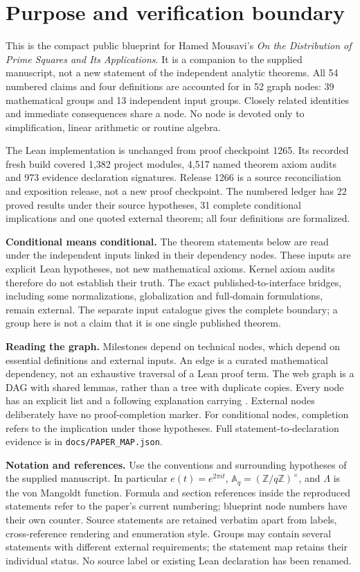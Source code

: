\section*{Purpose and verification boundary}
This is the compact public blueprint for Hamed Mousavi's
\emph{On the Distribution of Prime Squares and Its Applications}.
It is a companion to the supplied manuscript, not a new statement of the
independent analytic theorems. All 54 numbered claims and four definitions
are accounted for in 52 graph nodes: 39 mathematical groups and 13 independent
input groups. Closely related identities and immediate consequences share a
node. No node is devoted only to simplification, linear arithmetic or routine
algebra.

The Lean implementation is unchanged from proof checkpoint 1265.
Its recorded fresh build covered 1,382 project modules, 4,517 named theorem
axiom audits and 973 evidence declaration signatures. Release 1266 is a
source reconciliation and exposition release, not a new proof checkpoint.
The numbered ledger has 22 proved results under their source hypotheses,
31 complete conditional implications and one quoted external theorem;
all four definitions are formalized.

\textbf{Conditional means conditional.}
The theorem statements below are read under the independent inputs linked
in their dependency nodes. These inputs are explicit Lean hypotheses, not
new mathematical axioms. Kernel axiom audits therefore do not establish
their truth. The exact published-to-interface bridges, including some
normalizations, globalization and full-domain formulations, remain external.
The separate input catalogue gives the complete boundary; a group here is
not a claim that it is one single published theorem.

\textbf{Reading the graph.}
Milestones depend on technical nodes, which depend on essential definitions
and external inputs. An edge is a curated mathematical dependency, not an
exhaustive traversal of a Lean proof term. The web graph is a DAG with shared
lemmas, rather than a tree with duplicate copies. Every node has an explicit
\texttt{\string\uses} list and a following explanation carrying
\texttt{\string\proves}. External nodes deliberately have no proof-completion
marker. For conditional nodes, completion refers to the implication under
those hypotheses. Full statement-to-declaration evidence is in
\texttt{docs/PAPER\_MAP.json}.

\textbf{Notation and references.}
Use the conventions and surrounding hypotheses of the supplied manuscript.
In particular $e(t)=e^{2\pi it}$, $\mathbb A_q=(\mathbb Z/q\mathbb Z)^\times$,
and $\Lambda$ is the von Mangoldt function. Formula and section references
inside the reproduced statements refer to the paper's current numbering;
blueprint node numbers have their own counter. Source statements are retained
verbatim apart from labels, cross-reference rendering and enumeration style.
Groups may contain several statements with different external requirements;
the statement map retains their individual status. No source label or
existing Lean declaration has been renamed.


